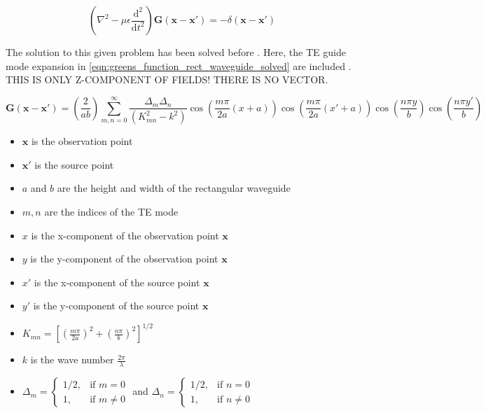 \begin{equation}
    \left(\nabla^2-\mu\epsilon\frac{\mathrm{d^2}}{\mathrm{d}t^2}\right)\mathbf{G}(\mathbf{x}-\mathbf{x'})=-\delta(\mathbf{x}-\mathbf{x'})
    \label{eqn:greens_function_wave_equ}
\end{equation}

The solution to this given problem has been solved before \cite{Collin_2015}. Here, the TE guide mode expansion in \autoref{eqn:greens_function_rect_waveguide_solved} are included \cite{Wilson_1981}. THIS IS ONLY Z-COMPONENT OF FIELDS! THERE IS NO VECTOR.

\begin{equation}
    \mathbf{G}(\mathbf{x}-\mathbf{x'})=\left(\frac{2}{ab}\right)\sum^\infty_{m,n=0}\frac{\Delta_m\Delta_n}{(K^2_{mn}-k^2)}\cos{\left( \frac{m\pi}{2a}(x+a) \right)}\cos{\left( \frac{m\pi}{2a}(x'+a) \right)}\cos{\left( \frac{n\pi y}{b}\right)}\cos{\left( \frac{n\pi y'}{b}\right)}
    \label{eqn:greens_function_rect_waveguide_solved}
\end{equation}

\begin{itemize}
    \item $\mathbf{x}$ is the observation point
    \item $\mathbf{x'}$ is the source point
    \item $a$ and $b$ are the height and width of the rectangular waveguide
    \item $m, n$ are the indices of the TE mode
    \item $x$ is the x-component of the observation point $\mathbf{x}$
    \item $y$ is the y-component of the observation point $\mathbf{x}$
    \item $x'$ is the x-component of the source point $\mathbf{x}$
    \item $y'$ is the y-component of the source point $\mathbf{x}$
    \item $K_{mn} = \left[ \left( \frac{m\pi}{2a} \right)^2+\left( \frac{n\pi}{b} \right)^2 \right]^{1/2}$
    \item $k$ is the wave number $\frac{2\pi}{\lambda}$
    \item $\Delta_m=\begin{cases}1/2, & \text{if } m = 0 \\1,       & \text{if } m \neq 0\end{cases}$ and $\Delta_n=\begin{cases}1/2, & \text{if } n = 0 \\1,       & \text{if } n \neq 0\end{cases}$
\end{itemize}

